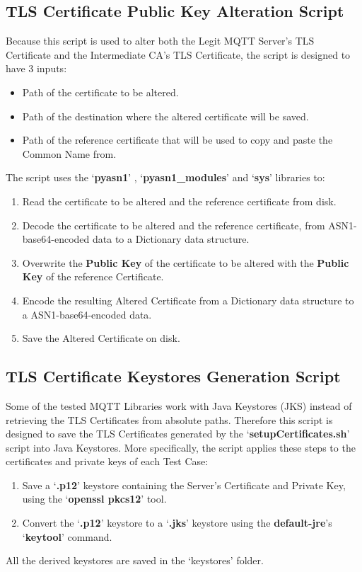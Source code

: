 \documentclass[binding=0.6cm,noexaminfo]{sapthesis}
\begin{document}
\subsection{TLS Certificate Public Key Alteration Script}

Because this script is used to alter both the Legit MQTT Server's TLS Certificate and the Intermediate CA's TLS Certificate, the script is designed to have 3 inputs:
\begin{itemize}
	\item Path of the certificate to be altered.
	\item Path of the destination where the altered certificate will be saved.
	\item Path of the reference certificate that will be used to copy and paste the Common Name from.
\end{itemize}
The script uses the `\textbf{pyasn1}' , `\textbf{pyasn1\_modules}' and `\textbf{sys}' libraries to:
\begin{enumerate}
	\item Read the certificate to be altered and the reference certificate from disk.
	\item Decode the certificate to be altered and the reference certificate, from ASN1-base64-encoded data to a Dictionary data structure.
	\item Overwrite the \textbf{Public Key} of the certificate to be altered with the \textbf{Public Key} of the reference Certificate.
	\item Encode the resulting Altered Certificate from a Dictionary data structure to a ASN1-base64-encoded data.
	\item Save the Altered Certificate on disk.
\end{enumerate}

\subsection{TLS Certificate Keystores Generation Script}

Some of the tested MQTT Libraries work with Java Keystores (JKS) instead of retrieving the TLS Certificates from absolute paths. Therefore this script is designed to save the TLS Certificates generated by the `\textbf{setupCertificates.sh}' script into Java Keystores.
More specifically, the script applies these steps to the certificates and private keys of each Test Case:
\begin{enumerate}
	\item Save a `\textbf{.p12}' keystore containing the Server's Certificate and Private Key, using the `\textbf{openssl pkcs12}' tool.
	\item Convert the `\textbf{.p12}' keystore to a `\textbf{.jks}' keystore using the \textbf{default-jre}'s `\textbf{keytool}' command.
\end{enumerate}
All the derived keystores are saved in the `keystores' folder.
\end{document}
